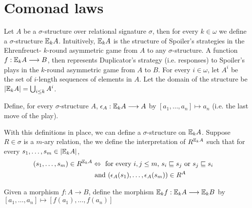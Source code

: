 \section{Comonad laws}
Let $A$ be a $\sigma$-structure over relational signature $\sigma$, then for every $k \in \omega$ we define a $\sigma$-structure ${\mathbb{E}_{k}A}$. Intuitively, ${\mathbb{E}_{k}A}$ is the structure of Spoiler's strategies in the Ehrenfreuct-{\Fraisse} $k$-round asymmetric game from $A$ to any $\sigma$-structure. A function $f:{\mathbb{E}_{k}A} \longrightarrow B$, then represents Duplicator's strategy (i.e. responses) to Spoiler's plays in the $k$-round asymmetric game from $A$ to $B$. For every $i \in \omega$, let $A^{i}$ be the set of $i$-length sequences of elements in $A$. Let the domain of the structure be $|{\mathbb{E}_{k}A}| = \bigcup_{i \leq k} A^{i}$. 
\begin{defn}
Define, for every $\sigma$-structure $A$, $\epsilon_{A}:{\mathbb{E}_{k}A} \longrightarrow A$ by $[a_{1},\dots,a_{n}] \mapsto a_{n}$ (i.e. the last move of the play). 
\label{defn:epsilon}
\end{defn}
With this definitions in place, we can define a $\sigma$-structure on ${\mathbb{E}_{k}A}$. Suppose $R \in \sigma$ is a $m$-ary relation, the we define the interpretation of $R^{{\mathbb{E}_{k}A}}$ such that for every $s_{1},\dots,s_{m} \in |{\mathbb{E}_{k}A}|$,
\begin{align}
(s_{1},\dots,s_{m}) \in R^{{\mathbb{E}_{k}A}} &\Leftrightarrow \text{ for every $i,j \leq m$, } s_{i} \sqsubseteq s_{j} \text{ or } s_{j} \sqsubseteq s_{i} & \label{eq:R1st} \\ 
&\text{ and } (\epsilon_{A}(s_{1}),\dots,\epsilon_{A}(s_{m})) \in R^{A} & \label{eq:R2nd}
\end{align}
\begin{defn}
Given a morphism $f:A \longrightarrow B$, define the morphism ${\mathbb{E}_{k}f}:{\mathbb{E}_{k}A} \longrightarrow {\mathbb{E}_{k}B}$ by $[a_{1},\dots,a_{n}] \mapsto [f(a_{1}),\dots,f(a_{n})]$
\label{defn:efComonadMorphism}
\end{defn}
